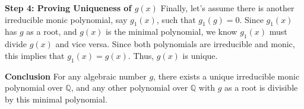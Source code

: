 \documentclass{article}
\newenvironment{proofbox}
  {\begin{mdframed}[linewidth=1pt,linecolor=black,backgroundcolor=white]\noindent\ignorespaces}
  {\end{mdframed}}
\begin{document}
\begin{proofbox}
\textbf{Step 4: Proving Uniqueness of \( g(x) \)}
Finally, let's assume there is another irreducible monic polynomial, say \( g_1(x) \), such that \( g_1(g) = 0 \). Since \( g_1(x) \) has \( g \) as a root, and \( g(x) \) is the minimal polynomial, we know \( g_1(x) \) must divide \( g(x) \) and vice versa. Since both polynomials are irreducible and monic, this implies that \( g_1(x) = g(x) \). Thus, \( g(x) \) is unique.

\textbf{Conclusion}
For any algebraic number \( g \), there exists a unique irreducible monic polynomial over \( \mathbb{Q} \), and any other polynomial over \( \mathbb{Q} \) with \( g \) as a root is divisible by this minimal polynomial.
    \end{proofbox}
\end{document}
